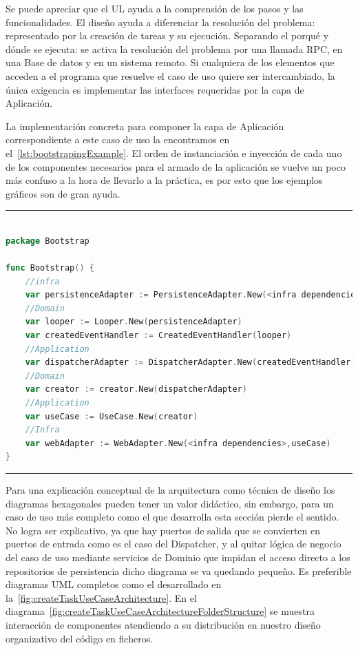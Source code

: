 Se puede apreciar que el UL ayuda a la comprensión de los pasos y las funcionalidades.
El diseño ayuda a diferenciar la resolución del problema: representado por la creación de tareas y su ejecución.
Separando el porqué y dónde se ejecuta: se activa la resolución del problema por una llamada RPC, en una Base de datos y en un sistema remoto.
Si cualquiera de los elementos que acceden a el programa que resuelve el caso de uso quiere ser intercambiado, la única exigencia es implementar las interfaces requeridas por la capa de Aplicación.

La implementación concreta para componer la capa de Aplicación correspondiente a este caso de uso la encontramos en el~\cref{lst:bootstrapingExample}.
El orden de instanciación e inyección de cada uno de los componentes necesarios para el armado de la aplicación se vuelve un poco más confuso a la hora de llevarlo a la práctica, es por esto que los ejemplos gráficos son de gran ayuda.

\phantom{blank}
\vspace{10mm}
\hrule
\begin{lstlisting}[language=Go,caption={Ejemplo de \textit{Bootstraping} del sistema },breaklines=true,label={lst:bootstrapingExample}]

package Bootstrap

func Bootstrap() {
    //infra
    var persistenceAdapter := PersistenceAdapter.New(<infra dependencies>)
    //Domain
    var looper := Looper.New(persistenceAdapter)
    var createdEventHandler := CreatedEventHandler(looper)
    //Application
    var dispatcherAdapter := DispatcherAdapter.New(createdEventHandler)
    //Domain
    var creator := creator.New(dispatcherAdapter)
    //Application
    var useCase := UseCase.New(creator)
    //Infra
    var webAdapter := WebAdapter.New(<infra dependencies>,useCase)
}

\end{lstlisting}
\hrule

Para una explicación conceptual de la arquitectura como técnica de diseño los diagramas hexagonales pueden tener un valor didáctico, sin embargo, para un caso de uso más completo como el que desarrolla esta sección pierde el sentido.
No logra ser explicativo, ya que hay puertos de salida que se convierten en puertos de entrada como es el caso del Dispatcher, y al quitar lógica de negocio del caso de uso mediante servicios de Dominio que impidan el acceso directo a los repositorios de persistencia dicho diagrama se va quedando pequeño.
Es preferible diagramas UML completos como el desarrollado en la~\cref{fig:createTaskUseCaseArchitecture}.
En el diagrama~\cref{fig:createTaskUseCaseArchitectureFolderStructure} se muestra interacción de componentes atendiendo a su distribución en nuestro diseño organizativo del código en ficheros.

